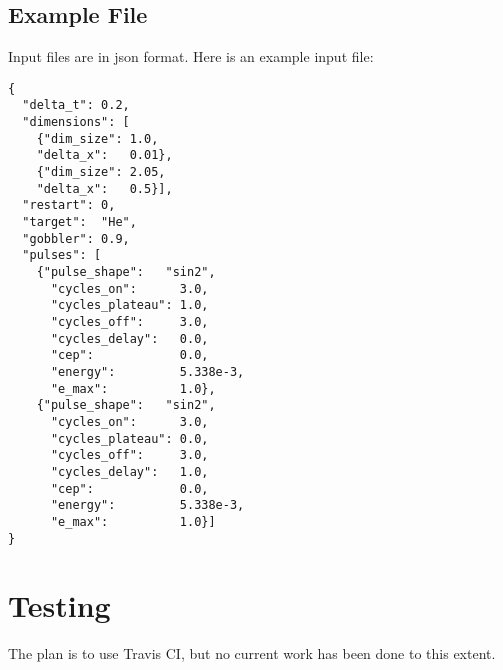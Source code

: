 \documentclass{article}
\begin{document}
\subsection{Example File} %
\label{sub:example_file}
Input files are in json format. Here is an example input file:
\begin{verbatim}
{
  "delta_t": 0.2,
  "dimensions": [
    {"dim_size": 1.0,
    "delta_x":   0.01},
    {"dim_size": 2.05,
    "delta_x":   0.5}],
  "restart": 0,
  "target":  "He",
  "gobbler": 0.9,
  "pulses": [
    {"pulse_shape":   "sin2",
      "cycles_on":      3.0,
      "cycles_plateau": 1.0,
      "cycles_off":     3.0,
      "cycles_delay":   0.0,
      "cep":            0.0,
      "energy":         5.338e-3,
      "e_max":          1.0},
    {"pulse_shape":   "sin2",
      "cycles_on":      3.0,
      "cycles_plateau": 0.0,
      "cycles_off":     3.0,
      "cycles_delay":   1.0,
      "cep":            0.0,
      "energy":         5.338e-3,
      "e_max":          1.0}]
}
\end{verbatim}


\section{Testing} %
\label{sec:testing}
The plan is to use Travis CI, but no current work has been done to this extent.
\end{document}
